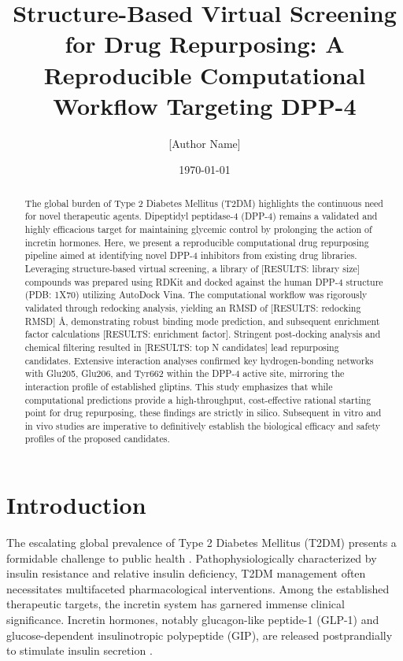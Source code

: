 \documentclass[12pt]{article}
\title{Structure-Based Virtual Screening for Drug Repurposing: A Reproducible Computational Workflow Targeting DPP-4}
\author{[Author Name]}
\date{\today}
\begin{document}
\maketitle

\begin{abstract}
The global burden of Type 2 Diabetes Mellitus (T2DM) highlights the continuous need for novel therapeutic agents. Dipeptidyl peptidase-4 (DPP-4) remains a validated and highly efficacious target for maintaining glycemic control by prolonging the action of incretin hormones. Here, we present a reproducible computational drug repurposing pipeline aimed at identifying novel DPP-4 inhibitors from existing drug libraries. Leveraging structure-based virtual screening, a library of [RESULTS: library size] compounds was prepared using RDKit and docked against the human DPP-4 structure (PDB: 1X70) utilizing AutoDock Vina. The computational workflow was rigorously validated through redocking analysis, yielding an RMSD of [RESULTS: redocking RMSD] \AA{}, demonstrating robust binding mode prediction, and subsequent enrichment factor calculations [RESULTS: enrichment factor]. Stringent post-docking analysis and chemical filtering resulted in [RESULTS: top N candidates] lead repurposing candidates. Extensive interaction analyses confirmed key hydrogen-bonding networks with Glu205, Glu206, and Tyr662 within the DPP-4 active site, mirroring the interaction profile of established gliptins. This study emphasizes that while computational predictions provide a high-throughput, cost-effective rational starting point for drug repurposing, these findings are strictly in silico. Subsequent in vitro and in vivo studies are imperative to definitively establish the biological efficacy and safety profiles of the proposed candidates.
\end{abstract}

\newpage

\section{Introduction}
The escalating global prevalence of Type 2 Diabetes Mellitus (T2DM) presents a formidable challenge to public health \citep{Deacon2011}. Pathophysiologically characterized by insulin resistance and relative insulin deficiency, T2DM management often necessitates multifaceted pharmacological interventions. Among the established therapeutic targets, the incretin system has garnered immense clinical significance. Incretin hormones, notably glucagon-like peptide-1 (GLP-1) and glucose-dependent insulinotropic polypeptide (GIP), are released postprandially to stimulate insulin secretion \citep{Drucker2006}.
\end{document}
